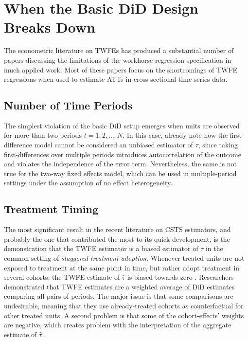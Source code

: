 \documentclass[hidelinks]{article}\usepackage[]{graphicx}\usepackage[]{color}
\begin{document}
\section{When the Basic DiD Design Breaks Down}

The econometric literature on TWFEs has produced a substantial number of papers discussing the limitations of the workhorse regression specification in much applied work. Most of these papers focus on the shortcomings of TWFE regressions when used to estimate ATTs in cross-sectional time-series data.

\subsection{Number of Time Periods}

The simplest violation of the basic DiD setup emerges when units are observed for more than two periods $t=1, 2, \dots, N$. In this case, \textcite{Angrist2009} already note how the first-difference model cannot be considered an unbiased estimator of $\tau$, since taking first-differences over multiple periods introduces autocorrelation of the outcome and violates the independence of the error term. Nevertheless, the same is not true for the two-way fixed effects model, which can be used in multiple-period settings under the assumption of no effect heterogeneity.

\subsection{Treatment Timing}

The most significant result in the recent literature on CSTS estimators, and probably the one that contributed the most to its quick development, is the demonstration that the TWFE estimator is a biased estimator of $\tau$ in the common setting of \textit{staggered treatment adoption}. Whenever treated units are not exposed to treatment at the same point in time, but rather adopt treatment in several cohorts, the TWFE estimate of $\hat{\tau}$ is biased towards zero \parencite{GoodmanBacon2021, Callaway2021}. Researchers demonstrated that TWFE estimates are a weighted average of DiD estimates comparing all pairs of periods. The major issue is that some comparisons are undesirable, meaning that they use already-treated cohorts as counterfactual for other treated units. A second problem is that some of the cohort-effects' weights are negative, which creates problem with the interpretation of the aggregate estimate of $\hat{\tau}$. 
\end{document}

